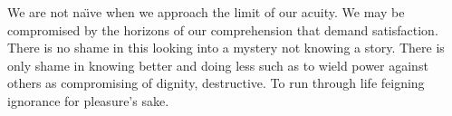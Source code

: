 

We are not na\"{\i}ve when we approach the limit of our acuity.  We
may be compromised by the horizons of our comprehension that demand
satisfaction.  There is no shame in this looking into a mystery not
knowing a story.  There is only shame in knowing better and doing less
such as to wield power against others as compromising of dignity,
destructive.  To run through life feigning ignorance for pleasure's
sake.

\bye
